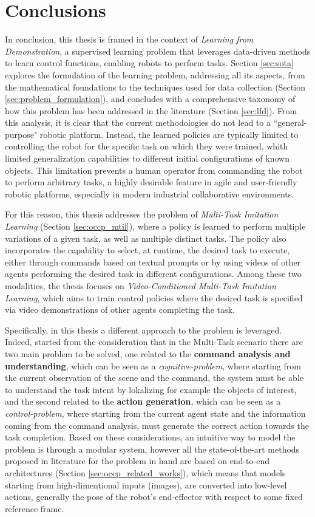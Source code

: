 \chapter{Conclusions}
\label{sec:conclusion}
In conclusion, this thesis is framed in the context of \textit{Learning from Demonstration}, a supervised learning problem that leverages data-driven methods to learn control functions, enabling robots to perform tasks. Section \ref{sec:sota} explores the formulation of the learning problem, addressing all its aspects, from the mathematical foundations to the techniques used for data collection (Section \ref{sec:problem_formulation}), and concludes with a comprehensive taxonomy of how this problem has been addressed in the literature (Section \ref{sec:lfd}). From this analysis, it is clear that the current methodologies do not lead to a ``general-purpose" robotic platform. Instead, the learned policies are typically limited to controlling the robot for the specific task on which they were trained, whith limited generalization capabilities to different initial configurations of known objects. This limitation prevents a human operator from commanding the robot to perform arbitrary tasks, a highly desirable feature in agile and user-friendly robotic platforms, especially in modern industrial collaborative environments.

For this reason, this thesis addresses the problem of \textit{Multi-Task Imitation Learning} (Section \ref{sec:occp_mtil}), where a policy is learned to perform multiple variations of a given task, as well as multiple distinct tasks. The policy also incorporates the capability to select, at runtime, the desired task to execute, either through commands based on textual prompts or by using videos of other agents performing the desired task in different configurations. Among these two modalities, the thesis focuses on \textit{Video-Conditioned Multi-Task Imitation Learning}, which aims to train control policies where the desired task is specified via video demonstrations of other agents completing the task.

Specifically, in this thesis a different approach to the problem is leveraged. Indeed, started from the consideration that in the Multi-Task scenario there are two main problem to be solved, one related to the \textbf{command analysis and understanding}, which can be seen as a \textit{cognitive-problem}, where starting from the current observation of the scene and the command, the system must be able to understand the task intent by lokalizing for example the objects of interest, and the second related to the \textbf{action generation}, which can be seen as a \textit{control-problem}, where starting from the current agent state and the information coming from the command analysis, must generate the correct action towards the task completion. Based on these considerations, an intuitive way to model the problem is through a modular system, however all the state-of-the-art methods proposed in literature for the problem in hand are based on end-to-end architectures (Section \ref{sec:occp_related_works}), which means that models starting from high-dimentional inputs (images), are converted into low-level actions, generally the pose of the robot's end-effector with respect to some fixed reference frame. 

